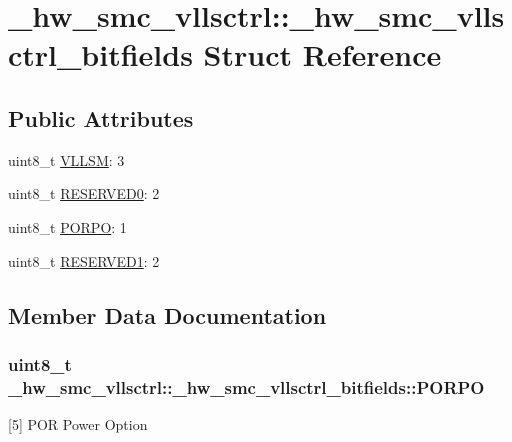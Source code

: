 \hypertarget{struct__hw__smc__vllsctrl_1_1__hw__smc__vllsctrl__bitfields}{}\section{\+\_\+hw\+\_\+smc\+\_\+vllsctrl\+:\+:\+\_\+hw\+\_\+smc\+\_\+vllsctrl\+\_\+bitfields Struct Reference}
\label{struct__hw__smc__vllsctrl_1_1__hw__smc__vllsctrl__bitfields}
\subsection*{Public Attributes}
\begin{DoxyCompactItemize}
\item 
uint8\+\_\+t \hyperlink{struct__hw__smc__vllsctrl_1_1__hw__smc__vllsctrl__bitfields_a4f2c44d155fc3a50d12843183e92e6b3}{V\+L\+L\+SM}\+: 3
\item 
uint8\+\_\+t \hyperlink{struct__hw__smc__vllsctrl_1_1__hw__smc__vllsctrl__bitfields_ac4d847389703eed9c098ada44151ab7f}{R\+E\+S\+E\+R\+V\+E\+D0}\+: 2
\item 
uint8\+\_\+t \hyperlink{struct__hw__smc__vllsctrl_1_1__hw__smc__vllsctrl__bitfields_a590605056b9114495b4bb1736bfb1c24}{P\+O\+R\+PO}\+: 1
\item 
uint8\+\_\+t \hyperlink{struct__hw__smc__vllsctrl_1_1__hw__smc__vllsctrl__bitfields_a79eb9a6dd3da28183e6a4a1213e41d5a}{R\+E\+S\+E\+R\+V\+E\+D1}\+: 2
\end{DoxyCompactItemize}


\subsection{Member Data Documentation}
\subsubsection[{\texorpdfstring{P\+O\+R\+PO}{PORPO}}]{\setlength{\rightskip}{0pt plus 5cm}uint8\+\_\+t \+\_\+hw\+\_\+smc\+\_\+vllsctrl\+::\+\_\+hw\+\_\+smc\+\_\+vllsctrl\+\_\+bitfields\+::\+P\+O\+R\+PO}\hypertarget{struct__hw__smc__vllsctrl_1_1__hw__smc__vllsctrl__bitfields_a590605056b9114495b4bb1736bfb1c24}{}\label{struct__hw__smc__vllsctrl_1_1__hw__smc__vllsctrl__bitfields_a590605056b9114495b4bb1736bfb1c24}
\mbox{[}5\mbox{]} P\+OR Power Option 
